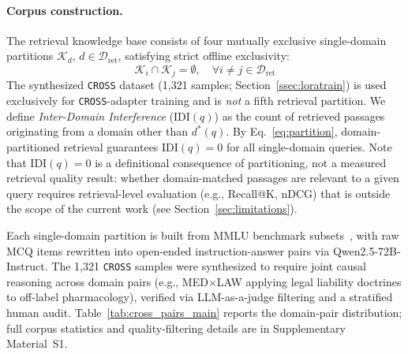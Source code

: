 \documentclass[a4paper,fleql,doubleblind]{cas-sc}
\begin{document}
\paragraph{Corpus construction.}
The retrieval knowledge base consists of four mutually exclusive single-domain
partitions $\mathcal{K}_d$, $d \in \mathcal{D}_{\text{ret}}$, satisfying strict
offline exclusivity:
\begin{equation}
    \mathcal{K}_i \cap \mathcal{K}_j = \emptyset,
    \quad \forall i \neq j \in \mathcal{D}_{\text{ret}}
    \label{eq:partition}
\end{equation}
The synthesized \texttt{CROSS} dataset (1,321 samples; Section~\ref{ssec:loratrain}) is
used exclusively for \texttt{CROSS}-adapter training and is \emph{not} a fifth
retrieval partition.
We define \emph{Inter-Domain Interference} ($\mathrm{IDI}(q)$) as the
count of retrieved passages originating from a domain other than $d^*(q)$.
By Eq.~\ref{eq:partition}, domain-partitioned retrieval guarantees
$\mathrm{IDI}(q) = 0$ for all single-domain queries.
Note that $\mathrm{IDI}(q){=}0$ is a definitional consequence of partitioning,
not a measured retrieval quality result: whether domain-matched passages are
relevant to a given query requires retrieval-level evaluation (e.g.,
Recall@K, nDCG) that is outside the scope of the current work
(see Section~\ref{sec:limitations}).

Each single-domain partition is built from MMLU benchmark
subsets~\citep{hendrycks2021mmlu}, with raw MCQ items rewritten into
open-ended instruction-answer pairs via Qwen2.5-72B-Instruct.
The 1,321 \texttt{CROSS} samples were synthesized to require joint causal
reasoning across domain pairs (e.g., MED$\times$LAW applying legal liability
doctrines to off-label pharmacology), verified via LLM-as-a-judge filtering
and a stratified human audit. Table~\ref{tab:cross_pairs_main} reports the
domain-pair distribution; full corpus statistics and quality-filtering details
are in Supplementary Material~S1.
\end{document}
